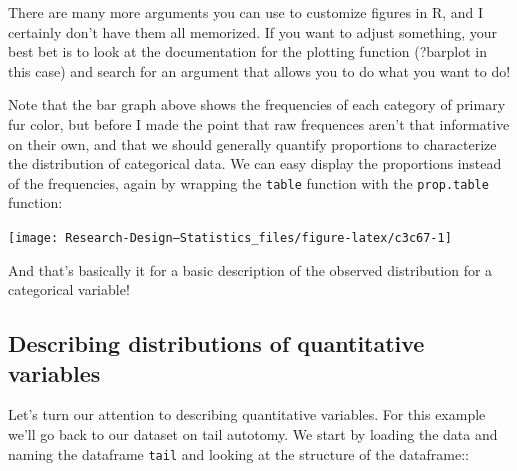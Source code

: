 \documentclass[
]{book}
\newenvironment{Shaded}{\begin{snugshade}}{\end{snugshade}}
\newcommand{\AttributeTok}[1]{\textcolor[rgb]{0.13,0.29,0.53}{#1}}
\newcommand{\DecValTok}[1]{\textcolor[rgb]{0.00,0.00,0.81}{#1}}
\newcommand{\FunctionTok}[1]{\textcolor[rgb]{0.13,0.29,0.53}{\textbf{#1}}}
\newcommand{\NormalTok}[1]{#1}
\newcommand{\SpecialCharTok}[1]{\textcolor[rgb]{0.81,0.36,0.00}{\textbf{#1}}}
\newcommand{\StringTok}[1]{\textcolor[rgb]{0.31,0.60,0.02}{#1}}
\begin{document}
There are many more arguments you can use to customize figures in R, and I certainly don't have them all memorized. If you want to adjust something, your best bet is to look at the documentation for the plotting function (?barplot in this case) and search for an argument that allows you to do what you want to do!

Note that the bar graph above shows the frequencies of each category of primary fur color, but before I made the point that raw frequences aren't that informative on their own, and that we should generally quantify proportions to characterize the distribution of categorical data. We can easy display the proportions instead of the frequencies, again by wrapping the \texttt{table} function with the \texttt{prop.table} function:

\begin{Shaded}
\end{Shaded}

\begin{center}\texttt{[image: Research-Design---Statistics\_files/figure-latex/c3c67-1]} \end{center}

And that's basically it for a basic description of the observed distribution for a categorical variable!

\subsection{Describing distributions of quantitative variables}\label{describing-distributions-of-quantitative-variables}

Let's turn our attention to describing quantitative variables. For this example we'll go back to our dataset on tail autotomy. We start by loading the data and naming the dataframe \texttt{tail} and looking at the structure of the dataframe::
\end{document}
